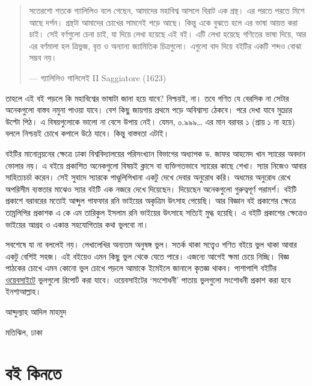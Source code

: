 \documentclass[
]{book}
\begin{document}
\begin{quote}
সতেরশো শতকে গ্যালিলিও বলে গেছেন, আমাদের মহাবিশ্ব আসলে বিরাট এক গ্রন্থ। এর পরতে পরতে মিশে আছে দর্শন। গ্রন্থটা আমাদের চোখের সামনেই পড়ে আছে। কিন্তু একে বুঝতে হলে এর ভাষা আয়ত্ত করা চাই। সেই বর্ণগুলো চেনা চাই, যা দিয়ে লেখা হয়েছে এই বই। এটি লেখা হয়েছে গণিতের ভাষা দিয়ে, আর এর বর্ণমালা হল ত্রিভুজ, বৃত্ত ও অন্যান্য জ্যামিতিক চিত্রগুলো। এগুলো বাদ দিয়ে বইটির একটি শব্দও বোঝা সম্ভব নয়।

--- গ্যালিলিও গালিলেই II Saggiatore (1623)
\end{quote}

তাহলে এই বই পড়লে কি মহাবিশ্বের ভাষাটা জানা হয়ে যাবে? নিশ্চয়ই, না। তবে গণিত যে বেরসিক না সেটার অনেকগুলো বাস্তব নমুনা পাওয়া যাবে। বেশ কিছু জায়গায় প্রথমে পড়ে অবিশ্বাস্য ঠেকবে। পরে দেখা যাবে মুদ্রোর উল্টো পিঠ। এ বিষয়গুলোকে ভালো না বেসে উপায় নেই। যেমন, ০.৯৯৯\ldots{} এর মান বরাবর ১ (প্রায় ১ না হয়ে) বললে নিশ্চয়ই চোখে কপালে উঠে যাবে। কিন্তু বাস্তবতা এটাই।

বইটির মানোন্নয়নের ক্ষেত্রে ঢাকা বিশ্ববিদ্যালয়ের পরিসংখ্যান বিভাগের অধ্যাপক ড. জাফর আহমেদ খান স্যারের অবদান ভোলার নয়। এ বইয়ে প্রকাশিত অনেকগুলো বিষয়ই ক্লাসে বা ব্যক্তিগতভাবে স্যারের কাছে শেখা। স্যার নিজেও আবার সাহিত্যচর্চা করেন। সেই সুবাদে স্যারকে পাণ্ডুলিপিখানা একটু দেখে দেবার অনুরোধ করি। অধমের অনুরোধ রেখে অপরিসীম ব্যস্ততার মাঝেও স্যার বইটি এক নজরে দেখে দিয়েছেন। দিয়েছেন অনেকগুলো গুরুত্বপূর্ণ পরামর্শ। বইটি প্রকাশে বরাবরের মতোই আব্দুল গাফফার রনি ভাইয়ের অকৃত্রিম উৎসাহ পেয়েছি। আর বিজ্ঞান বই প্রকাশের ক্ষেত্রে তাম্রলিপির প্রকাশক এ কে এম তারিকুল ইসলাম রনি ভাইয়ের উৎসাহে সত্যিই মুগ্ধ হয়েছি। এ বইটি প্রকাশের ক্ষেত্রেও ভাইয়ের আগ্রহ ও একান্ত সহযোগিতার কথা ভুলবো না।

সবশেষে যা না বললেই নয়। লেখালেখির অন্যতম অনুষঙ্গ ভুল। সতর্ক থাকা সত্ত্বেও গণিত বইয়ে ভুল থাকা আবার একটু বেশিই সহজ। এই বইয়েও এমন কিছু ভুল থেকে যেতে পারে। এজন্যে আগেই ক্ষমা চেয়ে নিচ্ছি। বিজ্ঞ পাঠকের চোখে এমন কোনো ভুল চোখে পড়লে আমাকে ইমেইলে জানালে কৃতজ্ঞ থাকব। পাশাপাশি বইটির \href{https://github.com/mahmudstat/os/issues/new}{ওয়েবসাইটে} ভুলগুলো রিপোর্ট করা যাবে। ওয়েবসাইটের `সংশোধনী' পাতায় ভুলগুলো সংশোধনী প্রকাশ করা হবে ইনশাআল্লাহ।

আব্দুল্যাহ আদিল মাহমুদ

মতিঝিল, ঢাকা

\hypertarget{ux9acux987-ux995ux9bfux9a8ux9a4ux9c7}{%
\section{বই কিনতে}\label{ux9acux987-ux995ux9bfux9a8ux9a4ux9c7}}
\end{document}
